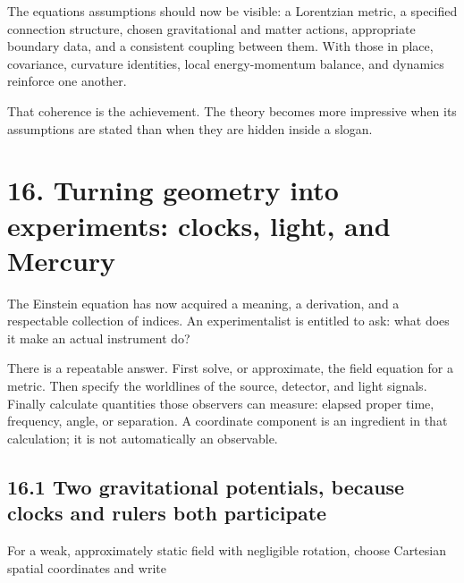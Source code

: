 \documentclass[
  11pt,
  letterpaper,
  oneside,
  openany]{scrbook}
\begin{document}
The equation\textquotesingle s assumptions should now be visible: a
Lorentzian metric, a specified connection structure, chosen
gravitational and matter actions, appropriate boundary data, and a
consistent coupling between them. With those in place, covariance,
curvature identities, local energy-momentum balance, and dynamics
reinforce one another.

That coherence is the achievement. The theory becomes more impressive
when its assumptions are stated than when they are hidden inside a
slogan.

\hypertarget{chapter-16}{%
\chapter{16. Turning geometry into experiments: clocks, light, and
Mercury}\label{chapter-16}}

The Einstein equation has now acquired a meaning, a derivation, and a
respectable collection of indices. An experimentalist is entitled to
ask: what does it make an actual instrument do?

There is a repeatable answer. First solve, or approximate, the field
equation for a metric. Then specify the worldlines of the source,
detector, and light signals. Finally calculate quantities those
observers can measure: elapsed proper time, frequency, angle, or
separation. A coordinate component is an ingredient in that calculation;
it is not automatically an observable.

\hypertarget{two-gravitational-potentials-because-clocks-and-rulers-both-participate}{%
\section{16.1 Two gravitational potentials, because clocks and rulers
both
participate}\label{two-gravitational-potentials-because-clocks-and-rulers-both-participate}}

For a weak, approximately static field with negligible rotation, choose
Cartesian spatial coordinates and write

\begin{center}
\begingroup
{}
\ifdim\wd\grmathbox>\linewidth
\resizebox{\linewidth}{!}{\usebox{\grmathbox}}
\else\usebox{\grmathbox}\fi
\endgroup
\end{center}
\end{document}
